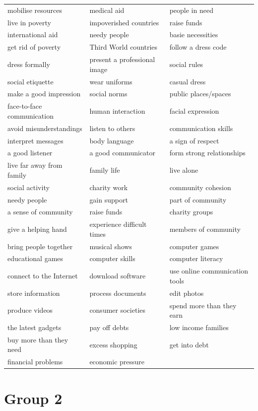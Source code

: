 \documentclass[10pt,a4paper]{article}
\begin{document}
{\begin{longtable}{@{}*{3}{p{}}@{}}
mobilise resources & medical aid & people in need \\
live in poverty & impoverished countries & raise funds \\
international aid & needy people & basie necessities \\
get rid of poverty & Third World countries & follow a dress code \\
dress formally & present a professional image & social rules \\
social etiquette & wear uniforms & casual dress \\
make a good impression & social norms & public places/spaces \\
face-to-face communication & human interaction & facial expression \\
avoid misunderstandings & listen to others & communication skills \\
interpret messages & body language & a sign of respect \\
a good listener & a good communicator & form strong relationships \\
live far away from family & family life & live alone \\
social activity & charity work & community cohesion \\
needy people & gain support & part of community \\
a sense of community & raise funds & charity groups \\
give a helping hand & experience difficult times & members of community \\
bring people together & musical shows & computer games \\
educational games & computer skills & computer literacy \\
connect to the Internet & download software & use online communication tools \\
store information & process documents & edit photos \\
produce videos & consumer societies & spend more than they earn \\
the latest gadgets & pay off debts & low income families \\
buy more than they need & excess shopping & get into debt \\
financial problems & economic pressure &  \\
\end{longtable}}

\section*{Group 2}
\end{document}
